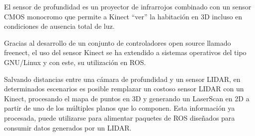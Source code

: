 El sensor de profundidad es un proyector de infrarrojos combinado con un sensor CMOS monocromo que permite a Kinect ``ver'' la habitación en 3D incluso en condiciones de ausencia total de luz.

Gracias al desarrollo de un conjunto de controladores open source llamado freenect\protect\footnotemark, el uso del sensor Kinect se ha extendido a sistemas operativos del tipo GNU/Linux y con este, su utilización en ROS.

Salvando distancias entre una cámara de profundidad y un sensor LIDAR, en determinados escenarios es posible remplazar un costoso sensor LIDAR con un Kinect, procesando el mapa de puntos en 3D y generando un LaserScan en 2D a partir de uno de los múltiples planos que lo componen. Esta información ya procesada, puede utilizarse para alimentar paquetes de ROS diseñados para consumir datos generados por un LIDAR.



